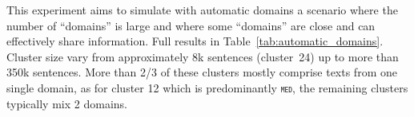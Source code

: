 \documentclass[11pt]{article}
\newcommand{\domain}[1]{\texttt{\textsc{#1}}}
\begin{document}
This experiment aims to simulate with automatic domains a scenario where the number of ``domains'' is large and where some ``domains'' are close and can effectively share information. Full results in Table~\ref{tab:automatic_domains}. Cluster size vary from approximately 8k sentences (cluster~24) up to more than 350k sentences. More than 2/3 of these clusters mostly comprise texts from one single domain, as for cluster 12 which is predominantly \domain{med}, the remaining clusters typically mix 2 domains.
\end{document}
